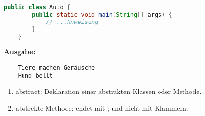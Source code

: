 \documentclass{article}
\begin{document}
\begin{lstlisting}[language=Java, caption={Main-Methode},label={lst:java_example}, mathescape=true]
    public class Auto {
        public static void main(String[] args) {
            // ...Anweisung
        }
    }
\end{lstlisting}

\textbf{Ausgabe:} \newline
\begin{verbatim}
    Tiere machen Geräusche
    Hund bellt
\end{verbatim}

\begin{enumerate}
    \item abstract: Deklaration einer abstrakten Klassen oder Methode.
    \item abstrekte Methode: endet mit ; und nicht mit Klammern.
\end{enumerate}
\end{document}
